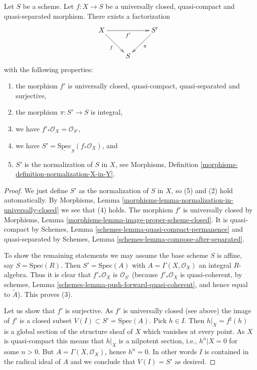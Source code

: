 \begin{lemma}
\label{lemma-stein-universally-closed}
Let $S$ be a scheme.
Let $f : X \to S$ be a universally closed, quasi-compact and
quasi-separated morphism.
There exists a factorization
$$
\xymatrix{
X \ar[rr]_{f'} \ar[rd]_f & & S' \ar[dl]^\pi \\
& S &
}
$$
with the following properties:
\begin{enumerate}
\item the morphism $f'$ is universally closed, quasi-compact, quasi-separated
and surjective,
\item the morphism $\pi : S' \to S$ is integral,
\item we have $f'_*\mathcal{O}_X = \mathcal{O}_{S'}$,
\item we have $S' = \underline{\text{Spec}}_S(f_*\mathcal{O}_X)$, and
\item $S'$ is the normalization of $S$ in $X$, see
Morphisms, Definition \ref{morphisms-definition-normalization-X-in-Y}.
\end{enumerate}
\end{lemma}

\begin{proof}
We just define $S'$ as the normalization of $S$ in $X$, so (5) and (2) hold
automatically. By
Morphisms, Lemma \ref{morphisms-lemma-normalization-in-universally-closed}
we see that (4) holds. The morphism $f'$ is universally closed by
Morphisms, Lemma \ref{morphisms-lemma-image-proper-scheme-closed}.
It is quasi-compact by
Schemes, Lemma \ref{schemes-lemma-quasi-compact-permanence}
and quasi-separated by
Schemes, Lemma \ref{schemes-lemma-compose-after-separated}.

\medskip\noindent
To show the remaining statements we may assume the base scheme $S$ is affine,
say $S = \text{Spec}(R)$. Then $S' = \text{Spec}(A)$ with
$A = \Gamma(X, \mathcal{O}_X)$ an integral $R$-algebra.
Thus it is clear that $f'_*\mathcal{O}_X$
is $\mathcal{O}_{S'}$ (because $f'_*\mathcal{O}_X$ is quasi-coherent,
by schemes, Lemma \ref{schemes-lemma-push-forward-quasi-coherent},
and hence equal to $\widetilde{A}$). This proves (3).

\medskip\noindent
Let us show that $f'$ is surjective. As $f'$ is universally closed (see above)
the image of $f'$ is a closed subset
$V(I) \subset S' = \text{Spec}(A)$. Pick $h \in I$. Then
$h|_X = f^\sharp(h)$ is a global section of the structure sheaf of
$X$ which vanishes at every point. As $X$ is quasi-compact this means
that $h|_X$ is a nilpotent section, i.e., $h^n|X = 0$ for some $n > 0$.
But $A = \Gamma(X, \mathcal{O}_X)$, hence $h^n = 0$.
In other words $I$ is contained in the radical ideal of $A$ and we conclude
that $V(I) = S'$ as desired.
\end{proof}

